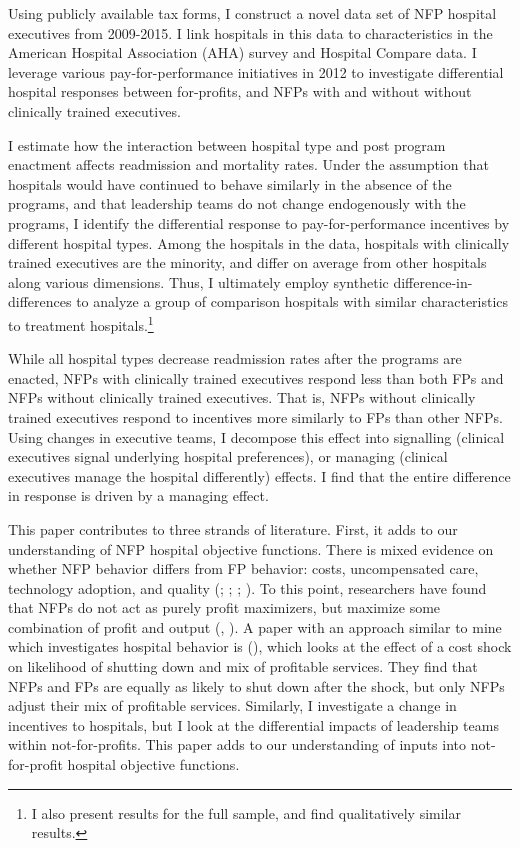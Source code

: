 \documentclass[12pt]{article}
\begin{document}
  Using publicly available tax forms, I construct a novel data set of NFP hospital executives from 2009-2015. I link hospitals in this data to characteristics in the American Hospital Association (AHA) survey and Hospital Compare data. I leverage various pay-for-performance initiatives in 2012 to investigate differential hospital responses between for-profits, and NFPs with and without without clinically trained executives. 
  
  I estimate how the interaction between hospital type and post program enactment affects readmission and mortality rates. Under the assumption that hospitals would have continued to behave similarly in the absence of the programs, and that leadership teams do not change endogenously with the programs, I identify the differential response to pay-for-performance incentives by different hospital types. Among the hospitals in the data, hospitals with clinically trained executives are the minority, and differ on average from other hospitals along various dimensions. Thus, I ultimately employ synthetic difference-in-differences to analyze a group of comparison hospitals with similar characteristics to treatment hospitals.\footnote{I also present results for the full sample, and find qualitatively similar results.} 
  
   While all hospital types decrease readmission rates after the programs are enacted, NFPs with clinically trained executives respond less than both FPs and NFPs without clinically trained executives. That is, NFPs without clinically trained executives respond to incentives more similarly to FPs than other NFPs. Using changes in executive teams, I decompose this effect into signalling (clinical executives signal underlying hospital preferences), or managing (clinical executives manage the hospital differently) effects. I find that the entire difference in response is driven by a managing effect. 

    This paper contributes to three strands of literature. First, it adds to our understanding of NFP hospital objective functions. There is mixed evidence on whether NFP behavior differs from FP behavior: costs, uncompensated care, technology adoption, and quality (\cite{sloan2000not}; \cite{eggleston2008hospital}; \cite{moscelli2018effect}; \cite{moscone2020public}). To this point, researchers have found that NFPs do not act as purely profit maximizers, but maximize some combination of profit and output (\cite{deneffe2002not}, \cite{chang2011nonprofit}). A paper with an approach similar to mine which investigates hospital behavior is \citeauthor{chang2011nonprofit} (\citeyear{chang2011nonprofit}), which looks at the effect of a cost shock on likelihood of shutting down and mix of profitable services. They find that NFPs and FPs are equally as likely to shut down after the shock, but only NFPs adjust their mix of profitable services. Similarly, I investigate a change in incentives to hospitals, but I look at the differential impacts of leadership teams within not-for-profits. This paper adds to our understanding of inputs into not-for-profit hospital objective functions. 
\end{document}
